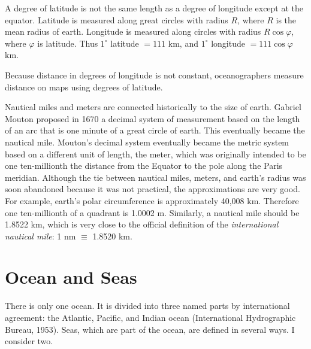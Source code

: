 A degree of latitude is not the same length as a degree of longitude
except at the equator. Latitude is measured along great circles with
radius $R$, where $R$ is the mean radius of earth. Longitude is
measured along circles with radius $R \cos \varphi$, where $\varphi$
is latitude. Thus $1^{\circ}$ latitude $ = 111$ km, and $1^{\circ}$
longitude $= 111 \cos \varphi$ km.

Because distance in degrees of longitude is not constant,
oceanographers measure distance on maps using degrees of latitude.

Nautical miles and meters are connected historically to the size of
earth. Gabriel Mouton proposed in 1670 a decimal system of measurement
based on the length of an arc that is one minute of a great circle of
earth.  This eventually became the nautical mile. Mouton's decimal
system eventually became the metric system based on a different unit
of length, the meter, which was originally intended to be one
ten-millionth the distance from the Equator to the pole along the
Paris meridian. Although the tie between nautical miles, meters, and
earth's radius was soon abandoned because it was not practical, the
approximations are very good. For example, earth's polar circumference
is approximately 40,008 km. Therefore one ten-millionth of a quadrant
is 1.0002 m. Similarly, a nautical mile should be 1.8522 km, which is
very close to the official definition of the
\textit{international nautical mile}: 1 nm $\equiv$ 1.8520 km.

\section{Ocean and Seas}
There is only one ocean. It is divided into three named parts by
international agreement: the Atlantic, Pacific, and Indian
ocean (International Hydrographic Bureau,
1953). Seas, which are part
of the ocean, are defined in several ways. I consider two.

